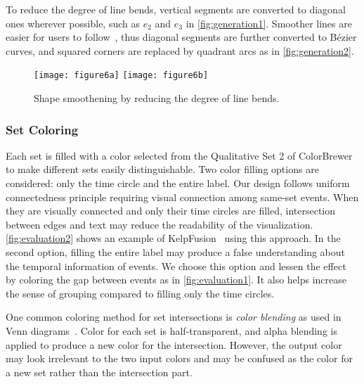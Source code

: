 To reduce the degree of line bends, vertical segments are converted to diagonal ones wherever possible, such as  $e_2$ and $e_3$ in \autoref{fig:generation1}. Smoother lines are easier for users to follow~\cite{Kim2010}, thus diagonal segments are further converted to B\'{e}zier curves, and squared corners are replaced by quadrant arcs as in \autoref{fig:generation2}.

\begin{figure}[!htb]
	\centering
		{\texttt{[image: figure6a]}}
	\hfill
		{\texttt{[image: figure6b]}}
	\caption{Shape smoothening by reducing the degree of line bends.}
	\label{fig:generation}
\end{figure}

\subsubsection{Set Coloring}
\label{sub:ts-eventmembership}
Each set is filled with a color selected from the Qualitative Set 2 of ColorBrewer~\cite{Harrower2003} to make different sets easily distinguishable. Two color filling options are considered: only the time circle and the entire label. Our design follows uniform connectedness principle requiring visual connection among same-set events. When they are visually connected and only their time circles are filled, intersection between edges and text may reduce the readability of the visualization. \autoref{fig:evaluation2} shows an example of KelpFusion~\cite{Meulemans2013} using this approach. In the second option, filling the entire label may produce a false understanding about the temporal information of events. We choose this option and lessen the effect by coloring the gap between events as in \autoref{fig:evaluation1}. It also helps increase the sense of grouping compared to filling only the time circles.

One common coloring method for set intersections is \emph{color blending} as used in Venn diagrams~\cite{Ware2013}. Color for each set is half-transparent, and alpha blending is applied to produce a new color for the intersection. However, the output color may look irrelevant to the two input colors and may be confused as the color for a new set rather than the intersection part.

